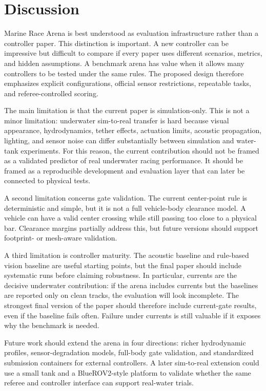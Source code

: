 \section{Discussion}

Marine Race Arena is best understood as evaluation infrastructure rather than a controller paper. This distinction is important. A new controller can be impressive but difficult to compare if every paper uses different scenarios, metrics, and hidden assumptions. A benchmark arena has value when it allows many controllers to be tested under the same rules. The proposed design therefore emphasizes explicit configurations, official sensor restrictions, repeatable tasks, and referee-controlled scoring.

The main limitation is that the current paper is simulation-only. This is not a minor limitation: underwater sim-to-real transfer is hard because visual appearance, hydrodynamics, tether effects, actuation limits, acoustic propagation, lighting, and sensor noise can differ substantially between simulation and water-tank experiments. For this reason, the current contribution should not be framed as a validated predictor of real underwater racing performance. It should be framed as a reproducible development and evaluation layer that can later be connected to physical tests.

A second limitation concerns gate validation. The current center-point rule is deterministic and simple, but it is not a full vehicle-body clearance model. A vehicle can have a valid center crossing while still passing too close to a physical bar. Clearance margins partially address this, but future versions should support footprint- or mesh-aware validation.

A third limitation is controller maturity. The acoustic baseline and rule-based vision baseline are useful starting points, but the final paper should include systematic runs before claiming robustness. In particular, currents are the decisive underwater contribution: if the arena includes currents but the baselines are reported only on clean tracks, the evaluation will look incomplete. The strongest final version of the paper should therefore include current-gate results, even if the baseline fails often. Failure under currents is still valuable if it exposes why the benchmark is needed.

Future work should extend the arena in four directions: richer hydrodynamic profiles, sensor-degradation models, full-body gate validation, and standardized submission containers for external controllers. A later sim-to-real extension could use a small tank and a BlueROV2-style platform to validate whether the same referee and controller interface can support real-water trials.
